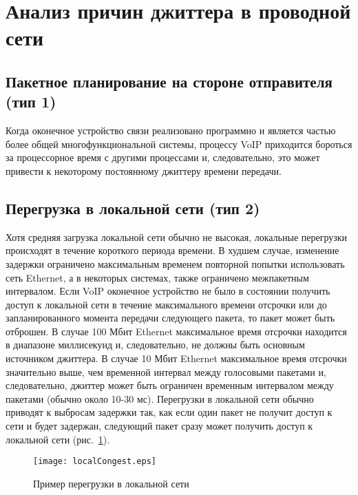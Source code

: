 \section{Анализ причин джиттера в проводной сети} \label{sect2_1}

\subsection{Пакетное планирование на стороне отправителя (тип 1)} \label{subsect2_1_1}
Когда оконечное устройство связи реализовано программно и является частью более общей многофункциональной системы, процессу VoIP приходится бороться за процессорное время с другими процессами и, следовательно, это может привести к некоторому постоянному джиттеру времени передачи.

\subsection{Перегрузка в локальной сети (тип 2)} \label{subsect2_1_2}
Хотя средняя загрузка локальной сети обычно не высокая, локальные перегрузки происходят в течение короткого периода времени. В худшем случае, изменение задержки ограничено максимальным временем повторной попытки использовать сеть Ethernet, а в некоторых системах, также ограничено межпакетным интервалом.
Если VoIP оконечное устройство не было в состоянии получить доступ к локальной сети в течение максимального времени отсрочки или до запланированного момента передачи следующего пакета, то пакет может быть отброшен. В случае 100 Мбит Ethernet максимальное время отсрочки находится в диапазоне миллисекунд и, следовательно, не должны быть основным источником джиттера. В случае 10 Мбит Ethernet максимальное время отсрочки значительно выше, чем временной интервал между голосовыми пакетами и, следовательно, джиттер может быть ограничен временным интервалом между пакетами (обычно около 10-30 мс).
Перегрузки в локальной сети обычно приводят к выбросам задержки так, как если один пакет не получит доступ к сети и будет задержан, следующий пакет сразу может получить доступ к локальной сети (рис. \ref{img:localCongest}).

\begin{figure} [!h]
  \center
\texttt{[image: localCongest.eps]}
  \caption{Пример перегрузки в локальной сети \cite{clark}}
  \label{img:localCongest}
\end{figure}

